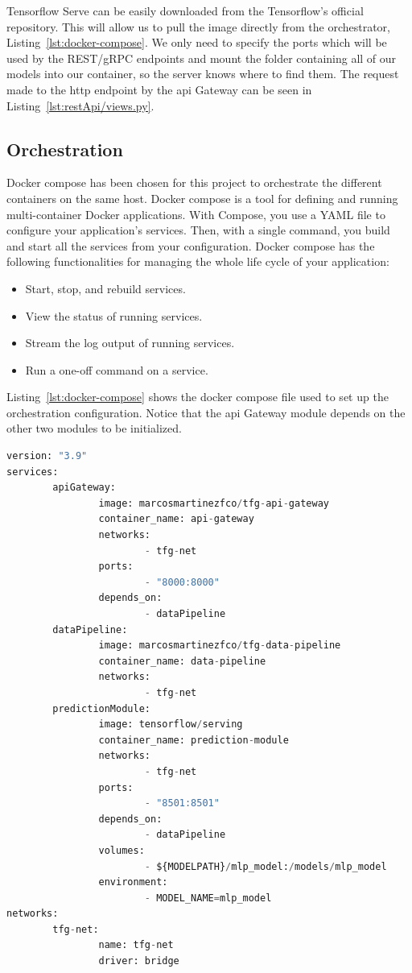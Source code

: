 Tensorflow Serve can be easily downloaded from the Tensorflow's official repository. This will allow us to pull the image directly from the orchestrator, Listing~\ref{lst:docker-compose}. We only need to specify the ports which will be used by the REST/gRPC endpoints and mount the folder containing all of our models into our container, so the server knows where to find them. The request made to the http endpoint by the \gls{api} Gateway can be seen in Listing~\ref{lst:restApi/views.py}.

\subsection{Orchestration}

\gls{Docker} compose has been chosen for this project to orchestrate the different containers on the same host. Docker compose is a tool for defining and running multi-container Docker applications. With Compose, you use a \gls{YAML} file to configure your application’s services. Then, with a single command, you build and start all the services from your configuration. Docker compose has the following functionalities for managing the whole life cycle of your application:~\cite{dockerCompose}

\begin{itemize}
    \item Start, stop, and rebuild services.
    \item View the status of running services.
    \item Stream the log output of running services.
    \item Run a one-off command on a service.
\end{itemize}

Listing~\ref{lst:docker-compose} shows the docker compose file used to set up the orchestration configuration. Notice that the \gls{api} Gateway module depends on the other two modules to be initialized. 

\newpage
\begin{lstlisting}[language=python,caption=docker-compose.yaml,label={lst:docker-compose}]
version: "3.9"
services:
        apiGateway:
                image: marcosmartinezfco/tfg-api-gateway
                container_name: api-gateway
                networks:
                        - tfg-net
                ports:
                        - "8000:8000"
                depends_on:
                        - dataPipeline
        dataPipeline:
                image: marcosmartinezfco/tfg-data-pipeline
                container_name: data-pipeline
                networks:
                        - tfg-net
        predictionModule:
                image: tensorflow/serving
                container_name: prediction-module
                networks:
                        - tfg-net
                ports:
                        - "8501:8501"
                depends_on:
                        - dataPipeline
                volumes:
                        - ${MODELPATH}/mlp_model:/models/mlp_model
                environment:
                        - MODEL_NAME=mlp_model
networks:
        tfg-net:
                name: tfg-net
                driver: bridge
\end{lstlisting}

